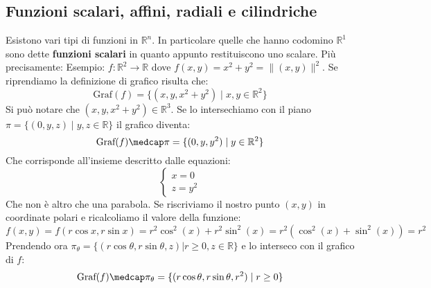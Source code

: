 \subsection{Funzioni scalari, affini, radiali e cilindriche}
Esistono vari tipi di funzioni in $\mathbb{R}^n$. In particolare quelle che 
hanno codomino $\mathbb{R}^1$ sono dette \textbf{funzioni scalari} in quanto 
appunto restituiscono uno scalare. Più precisamente:
Esempio: $f: \mathbb{R}^2 \to \mathbb{R}$ dove $f(x, y) = x^2 + y^2 = \lVert 
(x, y) \rVert ^2$. Se riprendiamo la definizione di grafico risulta che:
\begin{equation*}
	\text{Graf}(f) = \{(x, y, x^2 + y^2) \; | \; x, y \in \mathbb{R}^2\}
\end{equation*}
Si può notare che $(x, y, x^2 + y^2) \in \mathbb{R}^3$. Se lo intersechiamo con 
il piano $\pi = \{(0, y, z) \; | \; y, z \in \mathbb{R}\}$ il grafico diventa:
\begin{equation*}
	\text{Graf}(f) \medcap \pi = \{(0, y, y^2) \; | \; y \in \mathbb{R}^2\}
\end{equation*}
Che corrisponde all'insieme descritto dalle equazioni:
\begin{equation*}
	\begin{cases}
		x = 0\\
		z = y^2
	\end{cases}
\end{equation*}
Che non è altro che una parabola. %
Se riscriviamo il nostro punto $(x, y)$ in coordinate polari e ricalcoliamo il 
valore della funzione:
\begin{equation*}
    f(x, y) = f(r\cos{x}, r\sin{x}) = r^2\cos^2(x) + r^2\sin^2(x) = r^2(
    \cos^2(x) + \sin^2(x)) = r^2
\end{equation*}
Prendendo ora $\pi_\theta = \{(r\cos{\theta}, r\sin\theta, z) | r \geq 0, z \in 
\mathbb{R}\}$ e lo interseco con il grafico di $f$:
\begin{equation*}
	\text{Graf}(f) \medcap \pi_\theta = \{(r\cos{\theta}, r\sin\theta, r^2) \; 
    | \; r \geq 0\}
\end{equation*}

